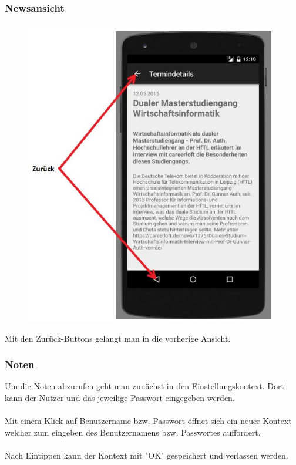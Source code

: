 \subsubsection{Newsansicht}
\begin{figure}[h]
	\centering
	\includegraphics[scale=0.8]{03_Bedienungsanleitung/img/news.jpg}
	\label{img:grafik-dummy}
\end{figure}

Mit den Zurück-Buttons gelangt man in die vorherige Ansicht.

\newpage
\subsubsection{Noten}

Um die Noten abzurufen geht man zunächst in den Einstellungskontext. Dort kann der Nutzer und das jeweilige Passwort eingegeben werden.
\\
\\
Mit einem Klick auf Benutzername bzw. Passwort öffnet sich ein neuer Kontext welcher zum eingeben des Benutzernamens bzw. Passwortes auffordert.
\\
\\
Nach Eintippen kann der Kontext mit "OK" gespeichert und verlassen werden.

